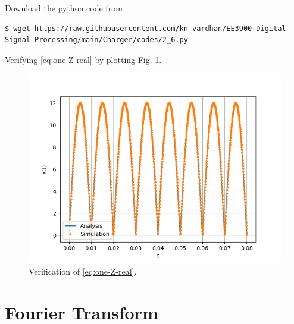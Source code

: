 \documentclass[journal,12pt,twocolumn]{IEEEtran}
\renewcommand\thesection{\arabic{section}}
\begin{document}
\begin{enumerate}[label=\thesection.\arabic*,ref=\thesection.\theenumi]
\solution Download the python code from
\begin{lstlisting}
$ wget https://raw.githubusercontent.com/kn-vardhan/EE3900-Digital-Signal-Processing/main/Charger/codes/2_6.py
\end{lstlisting}
Verifying \eqref{eq:one-Z-real}
by plotting Fig. \ref{fig:ver-real}.
\begin{figure}[!ht]
    \includegraphics[width=\columnwidth]{figs/2_6.png}
    \caption{Verification of \eqref{eq:one-Z-real}.}
    \label{fig:ver-real}
\end{figure}
\end{enumerate}
\section{Fourier Transform}
\end{document}
